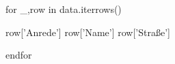 \documentclass[12pt,ngerman]{scrartcl}
\newcommand{\VAR}[1]{#1}
\newcommand{\BLOCK}[1]{#1}
\begin{document}
	\BLOCK{ for _,row in data.iterrows()}

    \VAR{row['Anrede'] }
    \VAR{row['Name'] }
    \VAR{row['Straße'] }

    
	\BLOCK{ endfor }
\end{document}
